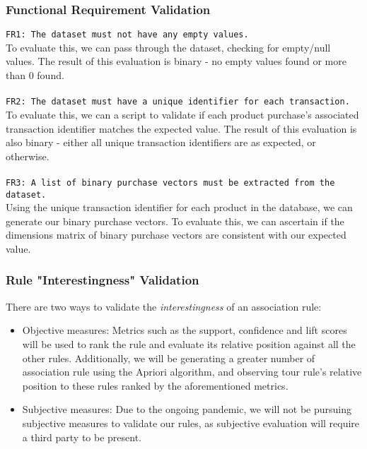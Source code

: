 \documentclass[a4paper,11pt]{article}
\begin{document}
\subsubsection*{Functional Requirement Validation}
\texttt{FR1: The dataset must not have any empty values.}\\
To evaluate this, we can pass through the dataset, checking for empty/null values. The result of this evaluation is binary - no empty values found or more than 0 found.\\\\
\texttt{FR2: The dataset must have a unique identifier for each transaction.}\\
To evaluate this, we can a script to validate if each product purchase's associated transaction identifier matches the expected value. The result of this evaluation is also binary - either all unique transaction identifiers are as expected, or otherwise.\\\\
\texttt{FR3: A list of binary purchase vectors must be extracted from the dataset.}\\
Using the unique transaction identifier for each product in the database, we can generate our binary purchase vectors.  To evaluate this, we can ascertain if the dimensions matrix of binary purchase vectors are consistent with our expected value.

\subsubsection*{Rule "Interestingness" Validation}
There are two ways to validate the \textit{interestingness} of an association rule:
\begin{itemize}
\item Objective measures: Metrics such as the support, confidence and lift scores will be used to rank the rule and evaluate its relative position against all the other rules.  Additionally, we will be generating a greater number of association rule using the Apriori algorithm,  and observing tour rule's relative position to these rules ranked by the aforementioned metrics.
\item Subjective measures: Due to the ongoing pandemic, we will not be pursuing subjective measures to validate our rules, as subjective evaluation will require a third party to be present.
\end{itemize}
\end{document}
